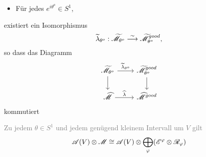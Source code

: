 \begin{paracol}{2} %
  \begin{thm}
    \begin{itemize}
      \item Für jedes $e^{i\theta^o}\in S^1$,
    \end{itemize}
    existiert ein Isomorphismus
    \[
      \widetilde\lambda_{\theta^o}: \widetilde{\mathscr{M}}_{\theta^o}
      \overset{\sim}{\longrightarrow}\widetilde{\mathscr{M}}^{good}_{\theta^o},
    \]
    so dass das Diagramm
    \[ \begin{tikzcd}
        \tilde\sM_{\theta^o} \dar \rar{\tilde\lambda_{\theta^o}} &
        \tilde\sM^{good}_{\theta^o} \dar
        \\\hat\sM \rar{\hat\lambda} &
        \hat\sM^{good}
    \end{tikzcd} \]
    kommutiert
  \end{thm}
\switchcolumn %
\begin{thm}
  \textcolor{gray}{%
    Zu jedem $\theta\in S^1$ und jedem genügend kleinem Intervall um $V$ gilt
    \[
      \mathscr{A}(V)\otimes\mathscr{M}\cong\mathscr{A}(V)\otimes\bigoplus_\varphi(\mathscr{E}^\varphi\otimes\mathscr{R}_\varphi)
    \]
  }
\end{thm}
\end{paracol} %
